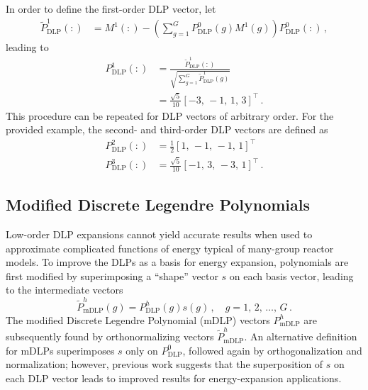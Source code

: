 \documentclass[5p,times,twocolumn,10pt]{elsarticle}
\begin{document}
    In order to define the  first-order DLP vector, let
    \begin{equation}
        \begin{split}
            \tilde{P}_{\text{DLP}}^1(:) &= M^1(:) - \left ( \sum_{g=1}^{G} 
            P_{\text{DLP}}^0(g) M^1(g) \right ) P_{\text{DLP}}^0(:)   \, ,
        \end{split}
    \end{equation}
    leading to
    \begin{equation}
        \begin{split}
            P_{\text{DLP}}^1(:) &= 
            \frac{\tilde{P}_{\text{DLP}}^1(:)}{\sqrt{\sum_{g=1}^{G} 
                    \tilde{P}_{\text{DLP}}^1(g)}} \\
            &= \frac{\sqrt{5}}{10} [-3,\,-1,\,1,\,3]^{\intercal} \, .
        \end{split}
    \end{equation}
    This procedure can be repeated for DLP vectors of arbitrary order. 
    For the provided example, the second- and third-order DLP
    vectors are defined as
    \begin{equation}
        \begin{split}
            P_{\text{DLP}}^2(:)  &= \frac{1}{2} [1,\,-1,\,-1,\,1]^{\intercal} \\
            P_{\text{DLP}}^3(:)  &= \frac{\sqrt{5}}{10} 
            [-1,\,3,\,-3,\,1]^{\intercal} \, .
        \end{split}
    \end{equation}
    
    \subsection{Modified Discrete Legendre Polynomials}
    
    Low-order DLP expansions cannot 
    yield accurate results when used to approximate 
    complicated functions of energy typical of many-group reactor models.
    To improve the DLPs as a basis for energy expansion,
    polynomials are first modified by superimposing a ``shape'' vector $s$ 
    on each basis vector, leading to the intermediate vectors
    \begin{equation}
        \tilde{P}^h_{\text{mDLP}}(g) =  
        P^h_{\text{DLP}}(g) s(g) \,, \quad g = 1,\, 2,\, \ldots ,\, G \, .
    \end{equation}
    The modified Discrete Legendre Polynomial (mDLP) vectors  
    $P^h_{\text{mDLP}}$ are subsequently found by 
    orthonormalizing vectors $\tilde{P}^h_{\text{mDLP}}$.  An alternative 
    definition for mDLPs superimposes $s$ only on $P^0_{\text{DLP}}$,
    followed again by orthogonalization and normalization; however,
    previous work suggests that the superposition of $s$ on each 
    DLP vector leads to improved results for energy-expansion 
    applications\cite{roberts2014psb}.
    
\end{document}
